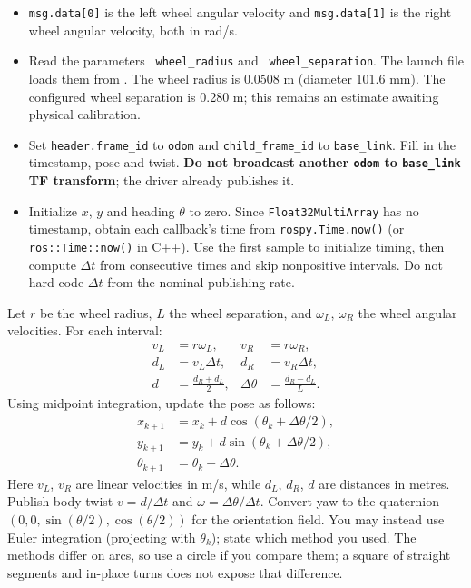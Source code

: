\documentclass[12pt]{article}
\begin{document}
\begin{itemize}
  \item \texttt{msg.data[0]} is the left wheel angular velocity and \texttt{msg.data[1]} is the right wheel angular velocity, both in rad/s.
  \item Read the parameters \texttt{\string~wheel\_radius} and \texttt{\string~wheel\_separation}. The launch file loads them from . The wheel radius is 0.0508 m (diameter 101.6 mm). The configured wheel separation is 0.280 m; this remains an estimate awaiting physical calibration.
  \item Set \texttt{header.frame\_id} to \texttt{odom} and \texttt{child\_frame\_id} to \texttt{base\_link}. Fill in the timestamp, pose and twist. \textbf{Do not broadcast another \texttt{odom} to \texttt{base\_link} TF transform}; the driver already publishes it.
  \item Initialize $x$, $y$ and heading $\theta$ to zero. Since \texttt{Float32MultiArray} has no timestamp, obtain each callback's time from \texttt{rospy.Time.now()} (or \texttt{ros::Time::now()} in C++). Use the first sample to initialize timing, then compute $\Delta t$ from consecutive times and skip nonpositive intervals. Do not hard-code $\Delta t$ from the nominal publishing rate.
\end{itemize}

Let $r$ be the wheel radius, $L$ the wheel separation, and
$\omega_L$, $\omega_R$ the wheel angular velocities. For each interval:
\begin{align*}
  v_L &= r\omega_L, & v_R &= r\omega_R,\\
  d_L &= v_L\Delta t, & d_R &= v_R\Delta t,\\
  d &= \frac{d_R+d_L}{2}, & \Delta\theta &= \frac{d_R-d_L}{L}.
\end{align*}
Using midpoint integration, update the pose as follows:
\begin{align*}
  x_{k+1} &= x_k + d\cos(\theta_k+\Delta\theta/2),\\
  y_{k+1} &= y_k + d\sin(\theta_k+\Delta\theta/2),\\
  \theta_{k+1} &= \theta_k+\Delta\theta.
\end{align*}
Here $v_L$, $v_R$ are linear velocities in m/s, while $d_L$, $d_R$, $d$
are distances in metres. Publish body twist $v=d/\Delta t$ and
$\omega=\Delta\theta/\Delta t$. Convert yaw to the quaternion
$(0,0,\sin(\theta/2),\cos(\theta/2))$ for the orientation field.
You may instead use Euler integration (projecting with $\theta_k$);
state which method you used. The methods differ on arcs, so use a circle
if you compare them; a square of straight segments and in-place turns
does not expose that difference.
\end{document}
